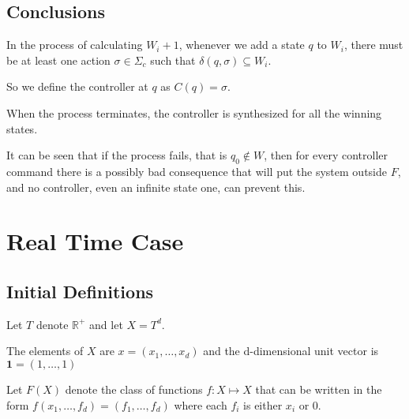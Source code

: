 \documentclass[table]{beamer}
\begin{document}
\subsection{Conclusions}
\begin{frame}
	\justify
	In the process of calculating $W_i+1$, whenever we add a state $q$ to $W_i$, 
	there must be at least one action $\sigma \in \Sigma_c$ such that $\delta(q,\sigma) \subseteq W_i$.
	
	\medskip	
	
	So we define the controller at $q$ as $C(q)=\sigma$.
	
	\medskip
	
	When the process terminates, the controller is synthesized for all the winning states.
		
	\medskip
	
	It can be seen that if the process fails, that is $q_0 \not\in W$, then for every controller
	command there is a possibly bad consequence that will put the system outside $F$, 
	and no controller, even an infinite state one, can prevent this.
\end{frame}


\section{Real Time Case}
\subsection{Initial Definitions}
\begin{frame}
	Let $T$ denote $\mathbb{R}^+$ and let $X=T^d$.
	
	\medskip
	
	The elements of $X$ are $x=(x_1,\ldots,x_d)$ and the d-dimensional unit vector is $\textbf{1}=(1,\ldots,1)$ 
	
	\medskip
	
	\begin{dfn}
		Let $F(X)$ denote the class of functions $f:X \mapsto X$ that can be written in the form $f(x_1,\ldots,f_d)=(f_1,\ldots,f_d)$ where each $f_i$ is either $x_i$ or $0$.
	\end{dfn}
\end{frame}
\end{document}

